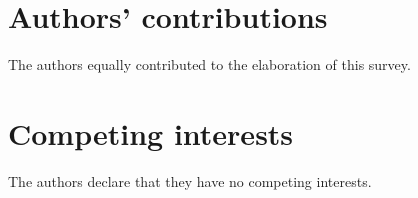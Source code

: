 \vspace{-5mm}
\section*{Authors’ contributions}
\noindent
The authors equally contributed to the elaboration of this survey. 

\vspace{-5mm}
\section*{Competing interests}
\noindent
The authors declare that they have no competing interests.
\vspace{-5mm}

%
%




%
%



